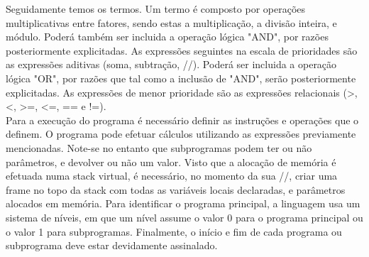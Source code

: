 Seguidamente temos os termos. Um termo é composto por operações multiplicativas entre fatores, sendo estas a multiplicação, a divisão inteira, e módulo. Poderá também ser incluida a operação lógica "AND", por razões posteriormente explicitadas. As expressões seguintes na escala de prioridades são as expressões aditivas (soma, subtração, //). Poderá ser incluida a operação lógica "OR", por razões que tal como a inclusão de "AND", serão posteriormente explicitadas. As expressões de menor prioridade são as expressões relacionais (>, <, >=, <=, == e !=).\\

Para a execução do programa é necessário definir as instruções e operações que o definem. O programa pode efetuar cálculos utilizando as expressões previamente mencionadas. Note-se no entanto que subprogramas podem ter ou não parâmetros, e devolver ou não um valor. Visto que a alocação de memória é efetuada numa stack virtual, é necessário, no momento da sua //, criar uma frame no topo da stack com todas as variáveis locais declaradas, e parâmetros alocados em memória. Para identificar o programa principal, a linguagem usa um sistema de níveis, em que um nível assume o valor 0 para o programa principal ou o valor 1 para subprogramas. Finalmente, o início e fim de cada programa ou subprograma deve estar devidamente assinalado.  

   




 



